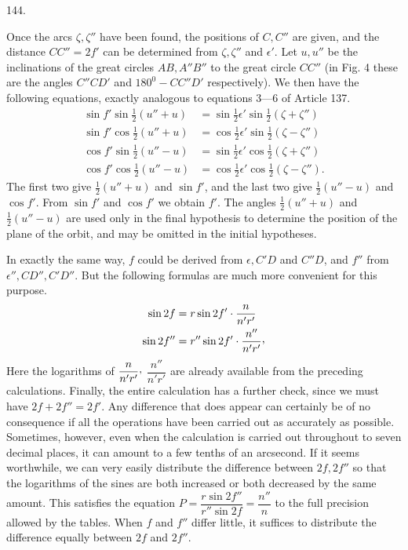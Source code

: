 \par{}\medskip
{}\begin{center}\hypertarget{native-195-article144}{}144.\end{center}
Once the arcs $\zeta,\zeta''$ have been found, the positions of $C,C''$ are given, and the distance $CC''=2f'$ can be determined from $\zeta,\zeta''$ and $\epsilon'$. Let $u,u''$ be the inclinations of the great circles $AB,A''B''$ to the great circle $CC''$ (in Fig. 4 these are the angles $C''CD'$ and $180^{0}-CC''D'$ respectively). We then have the following equations, exactly analogous to equations 3—6 of Article 137.
\[
\begin{aligned}
\sin f'\sin\tfrac12(u''+u)&=\sin\tfrac12\epsilon'\sin\tfrac12(\zeta+\zeta'')\\
\sin f'\cos\tfrac12(u''+u)&=\cos\tfrac12\epsilon'\sin\tfrac12(\zeta-\zeta'')\\
\cos f'\sin\tfrac12(u''-u)&=\sin\tfrac12\epsilon'\cos\tfrac12(\zeta+\zeta'')\\
\cos f'\cos\tfrac12(u''-u)&=\cos\tfrac12\epsilon'\cos\tfrac12(\zeta-\zeta'').
\end{aligned}
\]
The first two give $\tfrac12(u''+u)$ and $\sin f'$, and the last two give $\tfrac12(u''-u)$ and $\cos f'$. From $\sin f'$ and $\cos f'$ we obtain $f'$. The angles $\tfrac12(u''+u)$ and $\tfrac12(u''-u)$ are used only in the final hypothesis to determine the position of the plane of the orbit, and may be omitted in the initial hypotheses.

In exactly the same way, $f$ could be derived from $\epsilon,C'D$ and $C''D$, and $f''$ from $\epsilon'',CD'',C'D''$. But the following formulas are much more convenient for this purpose.
\[
\begin{aligned}
\sin2f&=r\sin2f'\cdot\frac{n}{n'r'}\\
\sin2f''&=r''\sin2f'\cdot\frac{n''}{n'r'}\mathpunct{\raisebox{.45ex}{,}}
\end{aligned}
\]
Here the logarithms of $\dfrac{n}{n'r'}\mathpunct{\raisebox{.45ex}{,}}$ $\dfrac{n''}{n'r'}$ are already available from the preceding calculations. Finally, the entire calculation has a further check, since we must have $2f+2f''=2f'$. Any difference that does appear can certainly be of no consequence if all the operations have been carried out as accurately as possible. Sometimes, however, even when the calculation is carried out throughout to seven decimal places, it can amount to a few tenths of an arcsecond. If it seems worthwhile, we can very easily distribute the difference between $2f,2f''$ so that the logarithms of the sines are both increased or both decreased by the same amount. This satisfies the equation $P=\dfrac{r\sin2f''}{r''\sin2f}=\dfrac{n''}{n}$ to the full precision allowed by the tables. When $f$ and $f''$ differ little, it suffices to distribute the difference equally between $2f$ and $2f''$.
